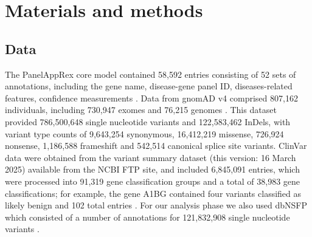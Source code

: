 %
%
%


\section{Materials and methods}

\subsection{Data}
The PanelAppRex core model contained 58,592 entries consisting of 52 sets of annotations, including the gene name, disease-gene panel ID, diseases-related features, confidence measurements \cite{lawless_panelapprex_2025}.
Data from gnomAD v4 comprised 807,162 individuals, including 730,947 exomes and 76,215 genomes \cite{karczewski2020mutational}. This dataset provided 786,500,648 single nucleotide variants and 122,583,462 InDels, with variant type counts of 9,643,254 synonymous, 16,412,219 missense, 726,924 nonsense, 1,186,588 frameshift and 542,514 canonical splice site variants. ClinVar data were obtained from the variant summary dataset (this version: 16 March 2025) available from the NCBI FTP site, and included 6,845,091 entries, which were processed into 91,319 gene classification groups and a total of 38,983 gene classifications; for example, the gene A1BG contained four variants classified as likely benign and 102 total entries \cite{landrum_clinvar_2018}. For our analysis phase we also used dbNSFP which consisted of a number of annotations for 121,832,908 single nucleotide variants 
\cite{liu_dbnsfp_2020}. 



